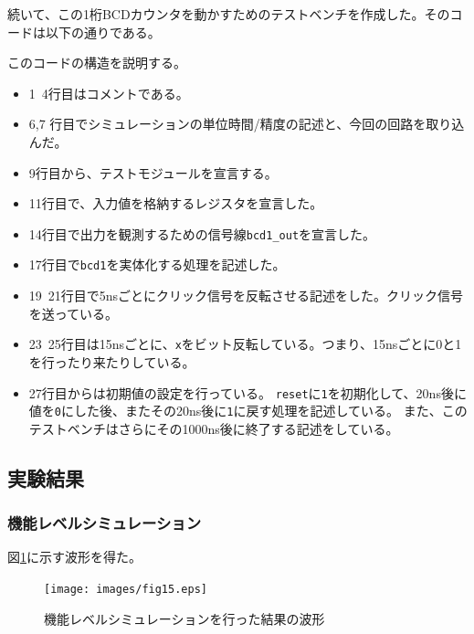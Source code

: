 \documentclass[uplatex]{jsarticle}
\begin{document}
続いて、この1桁BCDカウンタを動かすためのテストベンチを作成した。そのコードは以下の通りである。



このコードの構造を説明する。

\begin{itemize}
  \item 1~4行目はコメントである。
  \item 6,7 行目でシミュレーションの単位時間/精度の記述と、今回の回路を取り込んだ。
  \item 9行目から、テストモジュールを宣言する。
  \item 11行目で、入力値を格納するレジスタを宣言した。
  \item 14行目で出力を観測するための信号線{\tt bcd1\_out}を宣言した。
  \item 17行目で{\tt bcd1}を実体化する処理を記述した。
  \item 19~21行目で5nsごとにクリック信号を反転させる記述をした。クリック信号を送っている。
  \item 23~25行目は15nsごとに、{\tt x}をビット反転している。つまり、15nsごとに0と1を行ったり来たりしている。
  \item 27行目からは初期値の設定を行っている。
        {\tt reset}に{\tt 1}を初期化して、20ns後に値を{\tt 0}にした後、またその20ns後に{\tt 1}に戻す処理を記述している。
	  また、このテストベンチはさらにその1000ns後に終了する記述をしている。
\end{itemize}

\subsection{実験結果}

\subsubsection{機能レベルシミュレーション}

図\ref{fig:15}に示す波形を得た。

\begin{figure}[htb]
  \begin{center}
    \texttt{[image: images/fig15.eps]}
    \caption{機能レベルシミュレーションを行った結果の波形}
    \label{fig:15}
  \end{center}
\end{figure}
\end{document}
